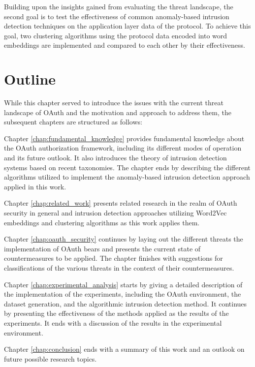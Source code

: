 Building upon the insights gained from evaluating the threat landscape, the second goal is to test the effectiveness of common anomaly-based intrusion detection techniques on the application layer data of the protocol. To achieve this goal, two clustering algorithms using the protocol data encoded into word embeddings are implemented and compared to each other by their effectiveness.


\section{Outline}
While this chapter served to introduce the issues with the current threat landscape of OAuth and the motivation and approach to address them, the subsequent chapters are structured as follows:

Chapter \ref{chap:fundamental_knowledge} provides fundamental knowledge about the OAuth authorization framework, including its different modes of operation and its future outlook. It also introduces the theory of intrusion detection systems based on recent taxonomies. The chapter ends by describing the different algorithms utilized to implement the anomaly-based intrusion detection approach applied in this work. 

Chapter \ref{chap:related_work} presents related research in the realm of OAuth security in general and intrusion detection approaches utilizing Word2Vec embeddings and clustering algorithms as this work applies them.

Chapter \ref{chap:oauth_security} continues by laying out the different threats the implementation of OAuth bears and presents the current state of countermeasures to be applied. The chapter finishes with suggestions for classifications of the various threats in the context of their countermeasures.

Chapter \ref{chap:experimental_analysis} starts by giving a detailed description of the implementation of the experiments, including the OAuth environment, the dataset generation, and the algorithmic intrusion detection method. It continues by presenting the effectiveness of the methods applied as the results of the experiments. It ends with a discussion of the results in the experimental environment.

Chapter \ref{chap:conclusion} ends with a summary of this work and an outlook on future possible research topics.
